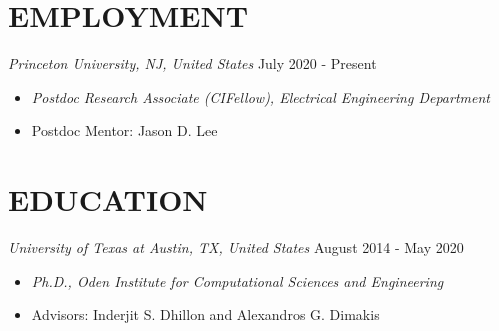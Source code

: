 \documentclass[margin, 10pt]{res} %
\begin{document}
\begin{resume}

 






\section{EMPLOYMENT}
  {\sl Princeton University, NJ, United States} \hfill July 2020 - Present
  \begin{itemize}
    \item {\sl Postdoc Research Associate (CIFellow), Electrical Engineering Department }
    \item Postdoc Mentor: Jason D. Lee
  \end{itemize}


\section{EDUCATION}
{\sl University of Texas at Austin, TX, United States} \hfill August 2014 - May 2020
\begin{itemize}
\item {\sl Ph.D., Oden Institute for Computational Sciences and Engineering} 
\item Advisors: Inderjit S. Dhillon and Alexandros 
  G. Dimakis  
\end{itemize} 




\end{resume}
\end{document}
